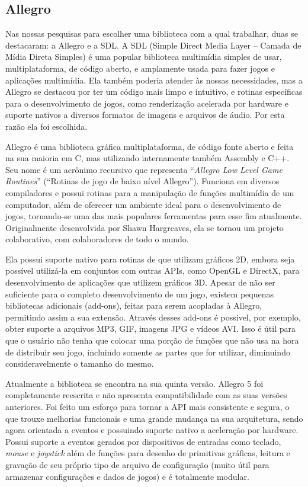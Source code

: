 \subsection{Allegro}
\label{allegro}
%
Nas nossas pesquisas para escolher uma biblioteca com a qual trabalhar, duas se destacaram: a Allegro e a SDL. A SDL (Simple Direct Media Layer -- Camada de Mídia Direta Simples) é uma popular biblioteca multimídia simples de usar, multiplataforma, de código aberto, e amplamente usada para fazer  jogos e aplicações multimídia. Ela também poderia atender às nossas necessidades, mas a Allegro se destacou por ter um código mais limpo e intuitivo, e rotinas específicas para o desenvolvimento de jogos, como renderização acelerada por hardware e suporte nativos a diversos formatos de imagens e arquivos de áudio. Por esta razão ela foi escolhida.
\par 
Allegro \cite{AllegroDoc} é uma biblioteca gráfica multiplataforma, de código fonte aberto e feita na sua maioria em C, mas utilizando internamente também Assembly e C++. Seu nome é um acrônimo recursivo que representa ``\textit{Allegro Low Level Game Routines}'' (``Rotinas de jogo de baixo nível Allegro''). Funciona em diversos compiladores e possui rotinas para a manipulação de funções multimídia de um computador, além de oferecer um ambiente ideal para o desenvolvimento de jogos, tornando-se uma das mais populares ferramentas para esse fim atualmente. Originalmente desenvolvida por Shawn Hargreaves, ela se tornou um projeto colaborativo, com colaboradores de todo o mundo.
\par
Ela possui suporte nativo para rotinas de que utilizam gráficos 2D, embora seja possível utilizá-la em conjuntos com outras APIs, como OpenGL e DirectX, para desenvolvimento de aplicações que utilizem gráficos 3D. Apesar de não ser suficiente para o completo desenvolvimento de um jogo, existem pequenas bibliotecas adicionais (add-ons), feitas para serem acopladas à Allegro, permitindo assim a sua extensão. Através desses add-ons é possível, por exemplo, obter suporte a arquivos MP3, GIF, imagens JPG e vídeos AVI. Isso é útil para que o usuário não tenha que colocar uma porção de funções que não usa na hora de distribuir seu jogo, incluindo somente as partes que for utilizar, diminuindo consideravelmente o tamanho do mesmo.
\par
Atualmente a biblioteca se encontra na sua quinta versão. Allegro 5 foi completamente reescrita e não apresenta compatibilidade com as suas versões anteriores. Foi feito um esforço para tornar a API mais consistente e segura, o que trouxe melhorias funcionais e uma grande mudança na sua arquitetura, sendo agora orientada a eventos e possuindo suporte nativo a aceleração por hardware. Possui suporte a eventos gerados por dispositivos de entradas como teclado, \textit{mouse} e \textit{joystick} além de funções para desenho de primitivas gráficas, leitura e gravação de seu próprio tipo de arquivo de configuração (muito útil para armazenar configurações e dados de jogos) e é totalmente modular.
